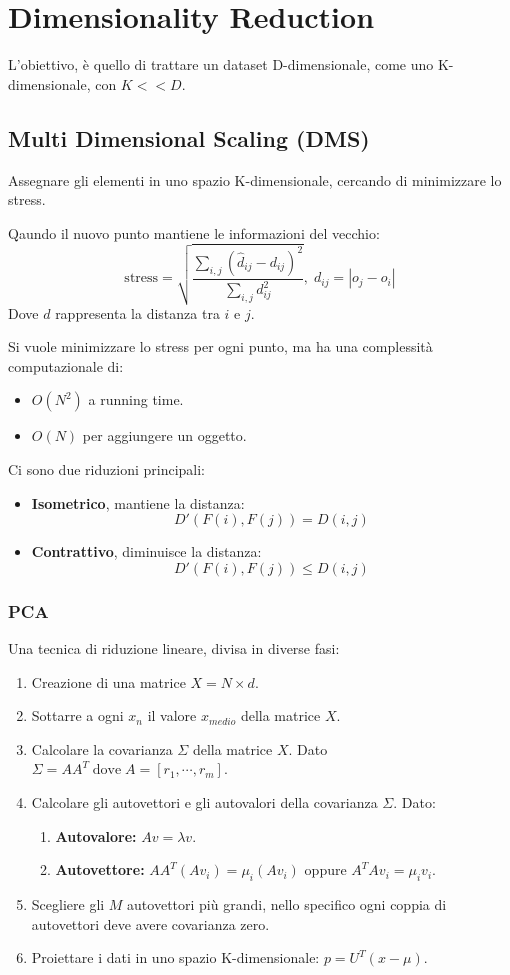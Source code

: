 \chapter{Dimensionality Reduction}
L'obiettivo, è quello di trattare un dataset D-dimensionale, come uno K-dimensionale, con $K << D$.

\section{Multi Dimensional Scaling (DMS)}
Assegnare gli elementi in uno spazio K-dimensionale, cercando di minimizzare lo stress.

\begin{defn}[Stress]
  Qaundo il nuovo punto mantiene le informazioni del vecchio:
  \[
    \text{stress} = \sqrt{\frac{\sum_{i,j} (\hat{d}_{ij} - d_{ij})^2}{\sum_{i,j} d_{ij}^2}}, \; d_{ij} = |o_j - o_i|
  \]
  Dove $d$ rappresenta la distanza tra $i$ e $j$.
\end{defn}
Si vuole minimizzare lo stress per ogni punto, ma ha una complessità computazionale di:
\begin{itemize}
  \item \textbf{$O(N^2)$} a running time.
  \item \textbf{$O(N)$} per aggiungere un oggetto.
\end{itemize}

Ci sono due riduzioni principali:
\begin{itemize}
  \item \textbf{Isometrico}, mantiene la distanza:
    \[
      D'(F(i), F(j)) = D(i,j)
    \]
  \item \textbf{Contrattivo}, diminuisce la distanza:
    \[
      D'(F(i), F(j)) \le D(i,j)
    \]
\end{itemize}

\subsection{PCA}
Una tecnica di riduzione lineare, divisa in diverse fasi:
\begin{enumerate}
  \item Creazione di una matrice $X = N \times d$.
  \item Sottarre a ogni $x_n$ il valore $x_{medio}$ della matrice $X$.
  \item Calcolare la covarianza $\Sigma$ della matrice $X$. Dato $\Sigma = AA^T \; \text{dove} \; A = [r_1, \cdots, r_m]$.
  \item Calcolare gli autovettori e gli autovalori della covarianza $\Sigma$. Dato:
    \begin{enumerate}
      \item \textbf{Autovalore:} $Av = \lambda v$.
      \item \textbf{Autovettore:} $AA^T(Av_i) = \mu_i(Av_i)$ oppure $A^TAv_i = \mu_iv_i$.
    \end{enumerate}
  \item Scegliere gli $M$ autovettori più grandi, nello specifico ogni coppia di autovettori deve avere covarianza zero.
  \item Proiettare i dati in uno spazio K-dimensionale: $p = U^T(x - \mu)$.
\end{enumerate}

